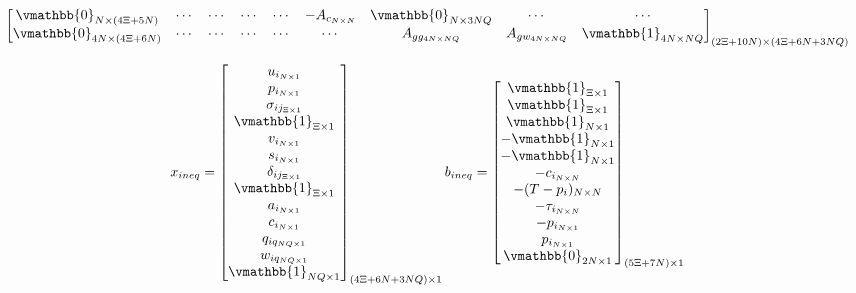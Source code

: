 \documentclass[letterpaper, 10pt, conference]{IEEEtran}
\begin{document}
\begin{table}[!t]
\begin{equation}
\begin{array}{c}
\begin{bmatrix}
	\vmathbb{0}_{N \times (4\Xi + 5N)}   & \cdots                                     & \cdots                                   & \cdots                     & \cdots                             & -A_{c_{N \times N}}              & \vmathbb{0}_{N \times 3NQ} & \cdots                & \cdots                    \\
	\vmathbb{0}_{4N \times (4\Xi + 6N)}  & \cdots                                     & \cdots                                   & \cdots                     & \cdots                             & \cdots                           & A_{gg_{4N \times NQ}}      & A_{gw_{4N \times NQ}} & \vmathbb{1}_{4N \times NQ} \\
    \end{bmatrix}_{(2\Xi + 10N) \times (4\Xi + 6N + 3NQ)}                                                                                                                                                                                                                                                                       \\
	\\
    x_{ineq} =
    \begin{bmatrix}
	u_{i_{N \times 1}} \\ p_{i_{N \times 1}} \\ \sigma_{ij_{\Xi \times 1}} \\ \vmathbb{1}_{\Xi \times 1} \\ v_{i_{N \times 1}} \\ s_{i_{N \times 1}} \\ \delta_{ij_{\Xi \times 1}} \\ \vmathbb{1}_{\Xi \times 1} \\ a_{i_{N \times 1}} \\ c_{i_{N \times 1}} \\ q_{iq_{NQ \times1}} \\w_{iq_{NQ \times 1}} \\ \vmathbb{1}_{NQ \times 1} \\
    \end{bmatrix}_{(4\Xi + 6N + 3NQ) \times 1}
    b_{ineq} =
    \begin{bmatrix}
	\vmathbb{1}_{\Xi \times 1} \\ \vmathbb{1}_{\Xi \times 1} \\ \vmathbb{1}_{N \times 1} \\ -\vmathbb{1}_{N \times 1} \\ -\vmathbb{1}_{N \times 1} \\ -c_{i_{N \times N}} \\ -(T-p_i)_{N \times N} \\ -\tau_{i_{N \times N}} \\ -p_{i_{N \times 1}} \\ p_{i_{N \times 1}} \\ \vmathbb{0}_{2N \times 1}
    \end{bmatrix}_{(5\Xi + 7N) \times 1}
\end{array}
\end{equation}\\
\end{table}
\end{document}

